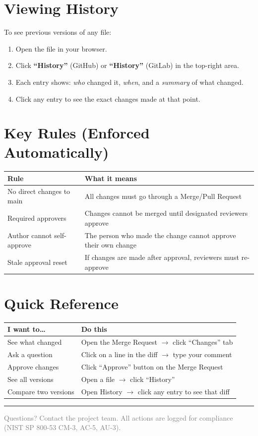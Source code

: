 \documentclass[11pt, letterpaper]{article}
\begin{document}
\section*{Viewing History}

To see previous versions of any file:
\begin{enumerate}[leftmargin=*, itemsep=2pt]
    \item Open the file in your browser.
    \item Click \textbf{``History''} (GitHub) or \textbf{``History''} (GitLab) in the top-right area.
    \item Each entry shows: \textit{who} changed it, \textit{when}, and a \textit{summary} of what changed.
    \item Click any entry to see the exact changes made at that point.
\end{enumerate}

\section*{Key Rules (Enforced Automatically)}

\begin{tabularx}{\textwidth}{lX}
\toprule
\textbf{Rule} & \textbf{What it means} \\
\midrule
No direct changes to main & All changes must go through a Merge/Pull Request \\
Required approvers & Changes cannot be merged until designated reviewers approve \\
Author cannot self-approve & The person who made the change cannot approve their own change \\
Stale approval reset & If changes are made after approval, reviewers must re-approve \\
\bottomrule
\end{tabularx}

\vspace{6pt}

\section*{Quick Reference}

\begin{tabularx}{\textwidth}{lX}
\toprule
\textbf{I want to\ldots} & \textbf{Do this} \\
\midrule
See what changed & Open the Merge Request $\rightarrow$ click ``Changes'' tab \\
Ask a question & Click on a line in the diff $\rightarrow$ type your comment \\
Approve changes & Click ``Approve'' button on the Merge Request \\
See all versions & Open a file $\rightarrow$ click ``History'' \\
Compare two versions & Open History $\rightarrow$ click any entry to see that diff \\
\bottomrule
\end{tabularx}

\vspace{6pt}
\noindent\rule{\textwidth}{0.5pt}
\begin{center}
\small\textcolor{gray}{Questions? Contact the project team. All actions are logged for compliance (NIST SP 800-53 CM-3, AC-5, AU-3).}
\end{center}
\end{document}
